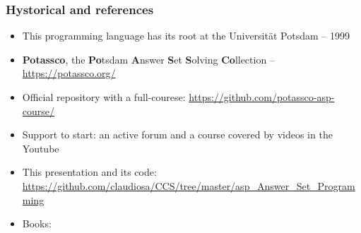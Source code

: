 \documentclass{beamer}
\begin{document}
\begin{frame}%

\frametitle{Hystorical and references}


\begin{block}{}
  \begin{itemize}
   \item This programming language has its root at the Universität Potsdam -- 1999
   
   \item  \textbf{Potassco}, the \textbf{Po}tsdam \textbf{A}nswer \textbf{S}et \textbf{S}olving \textbf{Co}llection -- \url{https://potassco.org/}
   
   \item Official repository with a full-courese: \url{https://github.com/potassco-asp-course/}

  \item Support to start: an active forum and a course covered by videos in the Youtube
  
  \item This presentation and its code:\\
  \url{https://github.com/claudiosa/CCS/tree/master/asp_Answer_Set_Programming}
  
  \item Books: 

 \end{itemize}
  
\end{block}

\end{frame}


\end{document}
